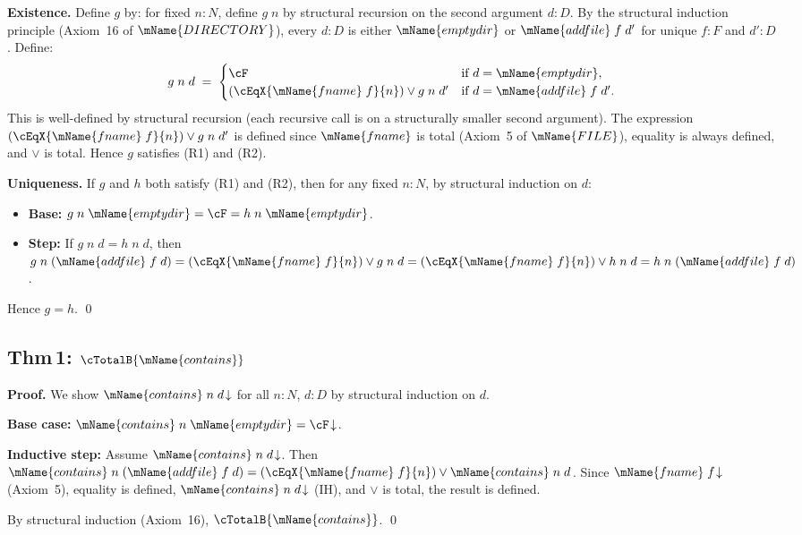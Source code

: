 \documentclass[11pt]{article}
\newcommand{\FILETYPE}{\mName{FILE}}
\newcommand{\DIR}{\mName{DIRECTORY}}
\newcommand{\fname}{\mName{fname}}
\begin{document}
\textbf{Existence.}
Define $g$ by: for fixed $n : N$, define $g\;n$ by structural
recursion on the second argument $d : D$.
By the structural induction principle (Axiom~16 of $\DIR$),
every $d : D$ is either $\mName{emptydir}$ or
$\mName{addfile}\;f\;d'$ for unique $f : F$ and $d' : D$.  Define:
\[
  g\;n\;d \;=\;
  \begin{cases}
    \cF & \text{if } d = \mName{emptydir}, \\
    (\cEqX{\fname\;f}{n}) \vee g\;n\;d'
      & \text{if } d = \mName{addfile}\;f\;d'.
  \end{cases}
\]
This is well-defined by structural recursion (each recursive call
is on a structurally smaller second argument).  The expression
$(\cEqX{\fname\;f}{n}) \vee g\;n\;d'$ is defined since $\fname$ is
total (Axiom~5 of $\FILETYPE$), equality is always defined, and
$\vee$ is total.  Hence $g$ satisfies (R1) and (R2).

\textbf{Uniqueness.}
If $g$ and $h$ both satisfy (R1) and (R2), then for any fixed
$n : N$, by structural induction on $d$:
\begin{itemize}
  \item \textbf{Base:}
    $g\;n\;\mName{emptydir} = \cF = h\;n\;\mName{emptydir}$.
  \item \textbf{Step:} If $g\;n\;d = h\;n\;d$, then
    $g\;n\;(\mName{addfile}\;f\;d)
    = (\cEqX{\fname\;f}{n}) \vee g\;n\;d
    = (\cEqX{\fname\;f}{n}) \vee h\;n\;d
    = h\;n\;(\mName{addfile}\;f\;d)$.
\end{itemize}
Hence $g = h$. \qed

\subsection{Thm\,1: $\cTotalB{\mName{contains}}$}

\textbf{Proof.}
We show $\mName{contains}\;n\;d\!\downarrow$ for all $n : N$,
$d : D$ by structural induction on $d$.

\textbf{Base case:}
$\mName{contains}\;n\;\mName{emptydir} = \cF\!\downarrow$.

\textbf{Inductive step:} Assume
$\mName{contains}\;n\;d\!\downarrow$.  Then
$\mName{contains}\;n\;(\mName{addfile}\;f\;d)
= (\cEqX{\fname\;f}{n}) \vee \mName{contains}\;n\;d$.
Since $\fname\;f\!\downarrow$ (Axiom~5), equality is defined,
$\mName{contains}\;n\;d\!\downarrow$ (IH), and $\vee$ is total,
the result is defined.

By structural induction (Axiom~16), $\cTotalB{\mName{contains}}$.
\qed
\end{document}
